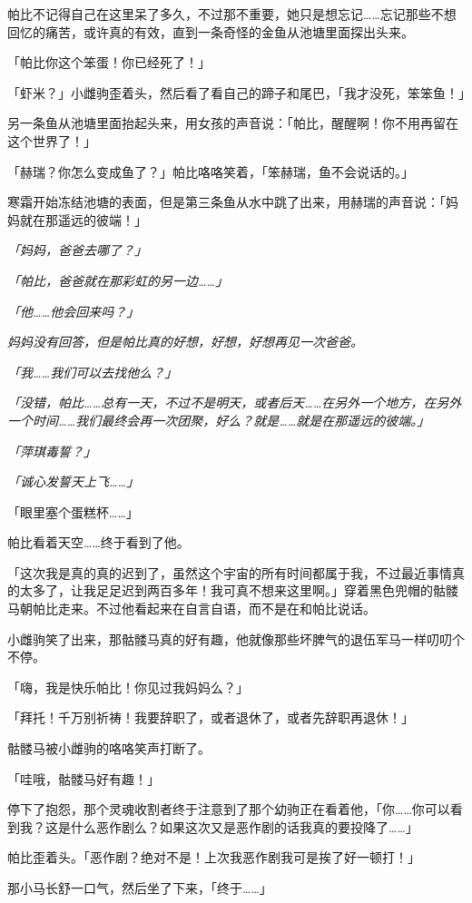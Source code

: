 帕比不记得自己在这里呆了多久，不过那不重要，她只是想忘记……忘记那些不想回忆的痛苦，或许真的有效，直到一条奇怪的金鱼从池塘里面探出头来。

「帕比你这个笨蛋！你已经死了！」

「虾米？」小雌驹歪着头，然后看了看自己的蹄子和尾巴，「我才没死，笨笨鱼！」

另一条鱼从池塘里面抬起头来，用女孩的声音说：「帕比，醒醒啊！你不用再留在这个世界了！」

「赫瑞？你怎么变成鱼了？」帕比咯咯笑着，「笨赫瑞，鱼不会说话的。」

寒霜开始冻结池塘的表面，但是第三条鱼从水中跳了出来，用赫瑞的声音说：「妈妈就在那遥远的彼端！」

\emph{「妈妈，爸爸去哪了？」}

\emph{「帕比，爸爸就在那彩虹的另一边……」}

\emph{「他……他会回来吗？」}

\emph{妈妈没有回答，但是帕比真的好想，好想，好想再见一次爸爸。}

\emph{「我……我们可以去找他么？」}

\emph{「没错，帕比……总有一天，不过不是明天，或者后天……在另外一个地方，在另外一个时间……我们最终会再一次团聚，好么？就是……就是在那遥远的彼端。」}

\emph{「萍琪毒誓？」}

\emph{「诚心发誓天上飞……」}

「眼里塞个蛋糕杯……」

帕比看着天空……终于看到了他。

「这次我是真的真的迟到了，虽然这个宇宙的所有时间都属于我，不过最近事情真的太多了，让我足足迟到两百多年！我可真不想来这里啊。」穿着黑色兜帽的骷髅马朝帕比走来。不过他看起来在自言自语，而不是在和帕比说话。

小雌驹笑了出来，那骷髅马真的好有趣，他就像那些坏脾气的退伍军马一样叨叨个不停。

「嗨，我是快乐帕比！你见过我妈妈么？」

「拜托！千万别祈祷！我要辞职了，或者退休了，或者先辞职再退休！」

骷髅马被小雌驹的咯咯笑声打断了。

「哇哦，骷髅马好有趣！」

停下了抱怨，那个灵魂收割者终于注意到了那个幼驹正在看着他，「你……你可以看到我？这是什么恶作剧么？如果这次又是恶作剧的话我真的要投降了……」

帕比歪着头。「恶作剧？绝对不是！上次我恶作剧我可是挨了好一顿打！」

那小马长舒一口气，然后坐了下来，「终于……」

